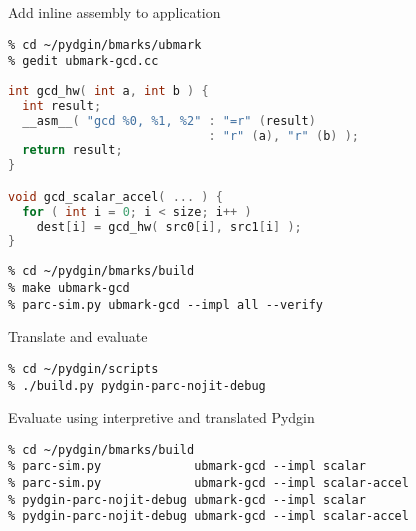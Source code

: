 \begin{task}
\begin{frame}[fragile]{Add inline assembly to application}

\vspace{-20pt}

\begin{verbatim}
% cd ~/pydgin/bmarks/ubmark
% gedit ubmark-gcd.cc
\end{verbatim}

\vspace{-20pt}

\begin{lstlisting}[language=c]
int gcd_hw( int a, int b ) {
  int result;
  __asm__( "gcd %0, %1, %2" : "=r" (result)
                            : "r" (a), "r" (b) );
  return result;
}

void gcd_scalar_accel( ... ) {
  for ( int i = 0; i < size; i++ )
    dest[i] = gcd_hw( src0[i], src1[i] );
}
\end{lstlisting}

\vspace{-20pt}

\begin{verbatim}
% cd ~/pydgin/bmarks/build
% make ubmark-gcd
% parc-sim.py ubmark-gcd --impl all --verify
\end{verbatim}

\end{frame}
\end{task}


\begin{task}
\begin{frame}[fragile]{Translate and evaluate}

\begin{verbatim}
% cd ~/pydgin/scripts
% ./build.py pydgin-parc-nojit-debug
\end{verbatim}

Evaluate using interpretive and translated Pydgin

\begin{verbatim}
% cd ~/pydgin/bmarks/build
% parc-sim.py             ubmark-gcd --impl scalar
% parc-sim.py             ubmark-gcd --impl scalar-accel
% pydgin-parc-nojit-debug ubmark-gcd --impl scalar
% pydgin-parc-nojit-debug ubmark-gcd --impl scalar-accel
\end{verbatim}

\end{frame}
\end{task}


